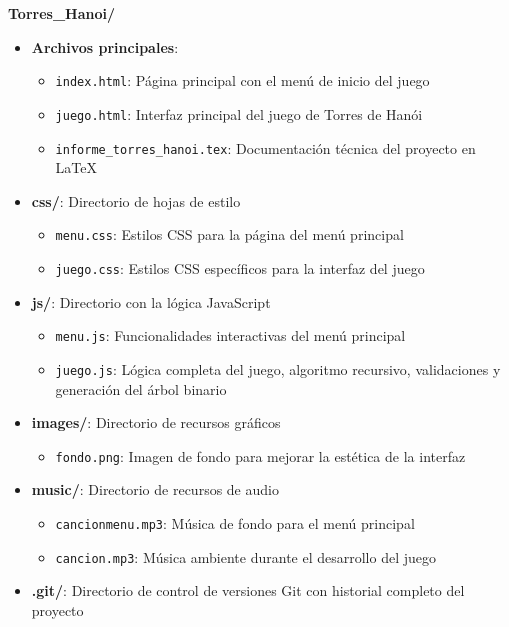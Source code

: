\documentclass{article}
\begin{document}
\textbf{Torres\_Hanoi/}
\begin{itemize}
    \item \textbf{Archivos principales}:
    \begin{itemize}
        \item \texttt{index.html}: Página principal con el menú de inicio del juego
        \item \texttt{juego.html}: Interfaz principal del juego de Torres de Hanói
        \item \texttt{informe\_torres\_hanoi.tex}: Documentación técnica del proyecto en LaTeX
    \end{itemize}
    
    \item \textbf{css/}: Directorio de hojas de estilo
    \begin{itemize}
        \item \texttt{menu.css}: Estilos CSS para la página del menú principal
        \item \texttt{juego.css}: Estilos CSS específicos para la interfaz del juego
    \end{itemize}
    
    \item \textbf{js/}: Directorio con la lógica JavaScript
    \begin{itemize}
        \item \texttt{menu.js}: Funcionalidades interactivas del menú principal
        \item \texttt{juego.js}: Lógica completa del juego, algoritmo recursivo, validaciones y generación del árbol binario
    \end{itemize}
    
    \item \textbf{images/}: Directorio de recursos gráficos
    \begin{itemize}
        \item \texttt{fondo.png}: Imagen de fondo para mejorar la estética de la interfaz
    \end{itemize}
    
    \item \textbf{music/}: Directorio de recursos de audio
    \begin{itemize}
        \item \texttt{cancionmenu.mp3}: Música de fondo para el menú principal
        \item \texttt{cancion.mp3}: Música ambiente durante el desarrollo del juego
    \end{itemize}
    
    \item \textbf{.git/}: Directorio de control de versiones Git con historial completo del proyecto
\end{itemize}
\end{document}
